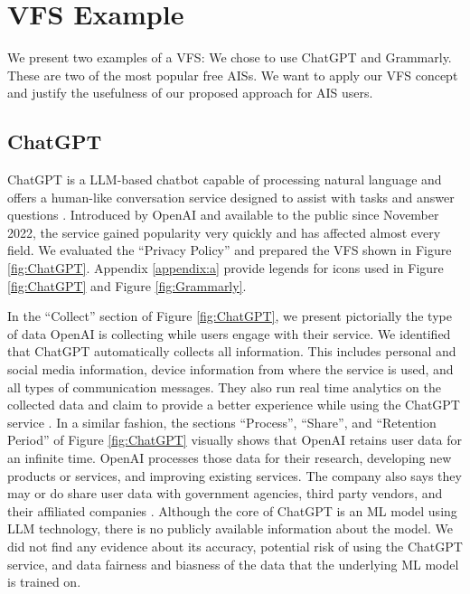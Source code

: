 \documentclass[manuscript,screen,review]{acmart}
\begin{document}
\section{VFS Example}

	We present two examples of a VFS: We chose to use ChatGPT and Grammarly. These are two of the most popular free AISs. We want to apply our VFS concept and justify the usefulness of our proposed approach for AIS users.

\subsection{ChatGPT}

	ChatGPT is a LLM-based chatbot capable of processing natural language and offers a human-like conversation service designed to assist with tasks and answer questions \cite{ortiz_what_nodate}. Introduced by OpenAI and available to the public since November 2022, the service gained popularity very quickly and has affected almost every field. We evaluated the \enquote{Privacy Policy} and prepared the VFS shown in Figure \ref{fig:ChatGPT}. Appendix \ref{appendix:a} provide legends for icons used in Figure \ref{fig:ChatGPT} and Figure \ref{fig:Grammarly}.

	In the \enquote{Collect} section of Figure \ref{fig:ChatGPT}, we present pictorially the type of data OpenAI is collecting while users engage with their service. We identified that ChatGPT automatically collects all information. This includes personal and social media information, device information from where the service is used, and all types of communication messages. They also run real time analytics on the collected data and claim to provide a better experience while using the ChatGPT service \cite{openai_privacy_2023}. In a similar fashion, the sections \enquote{Process}, \enquote{Share}, and \enquote{Retention Period} of Figure \ref{fig:ChatGPT} visually shows that OpenAI retains user data for an infinite time. OpenAI processes those data for their research, developing new products or services, and improving existing services. The company also says they may or do share user data with government agencies, third party vendors, and their affiliated companies \cite{openai_privacy_2023}. Although the core of ChatGPT is an ML model using LLM technology, there is no publicly available information about the model. We did not find any evidence about its accuracy, potential risk of using the ChatGPT service, and data fairness and biasness of the data that the underlying ML model is trained on.
	
\end{document}
